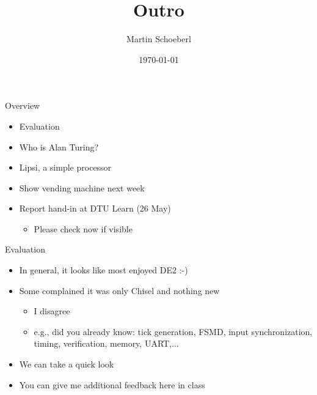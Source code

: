 

\newif\ifbook


\title{Outro}
\author{Martin Schoeberl}
\date{\today}



\begin{frame}
\titlepage
\end{frame}

\begin{frame}[fragile]{Overview}
\begin{itemize}
\item Evaluation
\item Who is Alan Turing?
\item Lipsi, a simple processor
\item Show vending machine next week
\item Report hand-in at DTU Learn (26 May)
\begin{itemize}
\item Please check now if visible
\end{itemize}
\end{itemize}
\end{frame}




\begin{frame}[fragile]{Evaluation}
\begin{itemize}
\item In general, it looks like most enjoyed DE2 :-)
\item Some complained it was only Chisel and nothing new
\begin{itemize}
\item I disagree
\item e.g., did you already know: tick generation, FSMD, input synchronization, timing, verification, memory, UART,...
\end{itemize}
\item We can take a quick look
\item You can give me additional feedback here in class
\end{itemize}
\end{frame}

